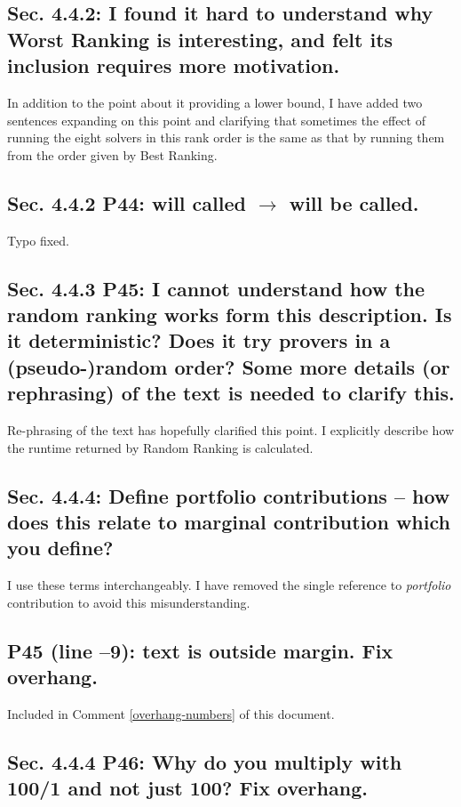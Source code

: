 \documentclass[]{article}
\begin{document}
\subsection{Sec. 4.4.2: I found it hard to understand why Worst Ranking is interesting, and felt its inclusion requires more motivation.}

In addition to the point about it providing a lower bound, I have added two sentences expanding on this point and clarifying that sometimes the effect of running the eight solvers in this rank order is the same as that by running them from the order given by \textsf{Best Ranking}.

\subsection{Sec. 4.4.2 P44: will called $\rightarrow$ will be called.}

Typo fixed.

\subsection{Sec. 4.4.3 P45: I cannot understand how the random ranking works form this description. Is it deterministic? Does it try provers in a (pseudo-)random order? Some more details (or rephrasing) of the text is needed to clarify this.}

Re-phrasing of the text has hopefully clarified this point.
I explicitly describe how the runtime returned by \textsf{Random Ranking} is calculated. 

\subsection{Sec. 4.4.4: Define portfolio contributions – how does this relate to marginal contribution which you define?}

I use these terms interchangeably. I have removed the single reference to \textit{portfolio} contribution to avoid this misunderstanding. 

\subsection{P45 (line –9): text is outside margin. Fix overhang.}

Included in Comment \ref{overhang-numbers} of this document.

\subsection{Sec. 4.4.4 P46: Why do you multiply with 100/1 and not just 100? Fix overhang.}
\end{document}
